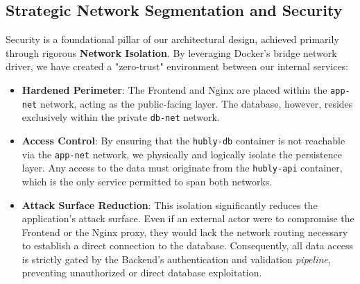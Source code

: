 \subsection{Strategic Network Segmentation and Security}

Security is a foundational pillar of our architectural design, achieved primarily through rigorous \textbf{Network Isolation}. By leveraging Docker's bridge network driver, we have created a "zero-trust" environment between our internal services:

\begin{itemize}
\item \textbf{Hardened Perimeter}: The Frontend and Nginx are placed within the \texttt{app-net} network, acting as the public-facing layer. The database, however, resides exclusively within the private \texttt{db-net} network.
\item \textbf{Access Control}: By ensuring that the \texttt{hubly-db} container is not reachable via the \texttt{app-net} network, we physically and logically isolate the persistence layer. Any access to the data must originate from the \texttt{hubly-api} container, which is the only service permitted to span both networks.
\item \textbf{Attack Surface Reduction}: This isolation significantly reduces the application's attack surface. Even if an external actor were to compromise the Frontend or the Nginx proxy, they would lack the network routing necessary to establish a direct connection to the database. Consequently, all data access is strictly gated by the Backend’s authentication and validation \textit{pipeline}, preventing unauthorized or direct database exploitation.
\end{itemize}